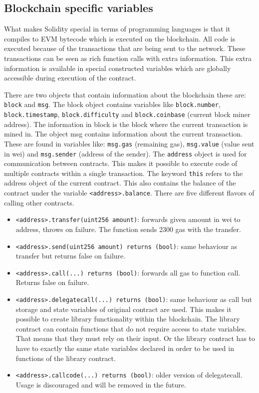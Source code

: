 \documentclass[a4paper]{article}
\begin{document}
\subsection{Blockchain specific variables}
What makes Solidity special in terms of programming languages is that it compiles to EVM bytecode which is executed on the blockchain. All code is executed because of the transactions that are being sent to the network. These transactions can be seen as rich function calls with extra information. This extra information is available in special constructed variables which are globally accessible during execution of the contract.\par
There are two objects that contain information about the blockchain these are: \texttt{block} and \texttt{msg}. The block object contains variables like \texttt{block.number}, \texttt{block.timestamp}, \texttt{block.difficulty} and \texttt{block.coinbase} (current block miner address). The information in block is the block where the current transaction is mined in. The object msg contains information about the current transaction. These are found in variables like: \texttt{msg.gas} (remaining gas), \texttt{msg.value} (value sent in wei) and \texttt{msg.sender} (address of the sender).
The \texttt{address} object is used for communication between contracts. This makes it possible to execute code of multiple contracts within a single transaction. The keyword \texttt{this} refers to the address object of the current contract. This also contains the balance of the contract under the variable \texttt{<address>.balance}. There are five different flavors of calling other contracts.
\begin{itemize}
    \item \texttt{<address>.transfer(uint256 amount)}: forwards given amount in wei to address, throws on failure. The function sends 2300 gas with the transfer. 
    \item \texttt{<address>.send(uint256 amount) returns (bool)}: same behaviour as transfer but returns false on failure.
    \item \texttt{<address>.call(...) returns (bool)}: forwards all gas to function call. Returns false on failure.
    \item \texttt{<address>.delegatecall(...) returns (bool)}: same behaviour as call but storage and state variables of original contract are used. This makes it possible to create library functionality within the blockchain. The library contract can contain functions that do not require access to state variables. That means that they must rely on their input. Or the library contract has to have to exactly the same state variables declared in order to be used in functions of the library contract.
    \item \texttt{<address>.callcode(...) returns (bool)}: older version of delegatecall. Usage is discouraged and will be removed in the future.
\end{itemize}
\end{document}
